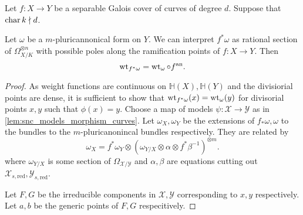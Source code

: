 \begin{theorem}\label{prop:weightfunction_fullback}
	Let $f: X \to Y$ be a separable Galois cover of curves of degree $d$. 
	Suppose that $\operatorname{char} k \nmid d$. 
	
	Let $\omega $ be a $m$-pluricannonical form on $Y$. 
	We can interpret $f^*\omega$ as rational section of $\Omega_{X / K}^{\otimes n}$ with possible poles along the ramification points of $f: X \to Y$. 
	Then \[
		\operatorname{wt}_{f^*\omega} = \operatorname{wt}_{\omega} \circ f{}^{\text{an}}
	.\] 
\end{theorem}
\begin{proof}
	As weight functions are continuous on $\mathbb{H}(X), \mathbb{H}(Y)$ and the divisiorial points are dense, it is sufficient to show that $\operatorname{wt}_{f^* \omega}(x) = \operatorname{wt}_{\omega}(y)$ 
	for divisorial points  $x, y$ such that $\phi(x) = y$. 
	Choose a map of models $\psi: \mathscr X \to \mathscr Y$ as in \cref{lem:snc_models_morphism_curves}.  
	Let $\omega_X, \omega_Y$ be the extensions of $f_*\omega, \omega$ to the bundles to the $m$-pluricanonincal bundles  respectively. 
	They are related by \[
		\omega_{X} = f^* \omega_{Y} \otimes (\omega_{Y / X} \otimes \alpha \otimes f^*\beta ^{-1})^{\otimes m}
	.\] 
	where $\omega_{ Y /  X}$ is some section of $\Omega_{\mathscr X / \mathscr Y}$ and $\alpha, \beta$ are equations cutting out $\mathscr X_{s, \text{red}}, \mathscr Y_{s, \text{red}}$. 

	Let $F, G$ be the irreducible components in $\mathscr X, \mathscr Y$ corresponding to $x, y$ respectively. 
	Let $a, b$ be the generic points of $F, G$ respecitively. 


\end{proof}
